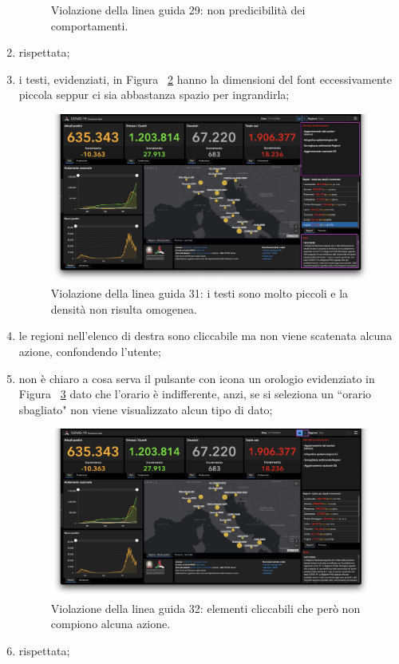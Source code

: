 \begin{enumerate}
\begin{figure}[H]
            \caption{Violazione della linea guida 29: non predicibilità dei comportamenti.}
            \label{fig:guidelines-violations-10}
        \end{figure}
    \item rispettata;
    \item i testi, evidenziati, in Figura ~\ref{fig:guidelines-violations-11} hanno la dimensioni del font eccessivamente piccola seppur ci sia abbastanza spazio per ingrandirla;
        \begin{figure}[H]
            \centering
            \includegraphics[width=0.5\columnwidth]{../../../assets/images/verifica-risorse-esistenti/guidelines_violations_13}
            \caption{Violazione della linea guida 31: i testi sono molto piccoli e la densità non risulta omogenea.}
            \label{fig:guidelines-violations-11}
        \end{figure}
    \item le regioni nell'elenco di destra sono cliccabile ma non viene scatenata alcuna azione, confondendo l'utente;
    \item non è chiaro a cosa serva il pulsante con icona un orologio evidenziato in Figura ~\ref{fig:guidelines-violations-12} dato che l'orario è indifferente, anzi, se si seleziona un ``orario sbagliato" non viene visualizzato alcun tipo di dato;
        \begin{figure}[H]
            \centering
            \includegraphics[width=0.5\columnwidth]{../../../assets/images/verifica-risorse-esistenti/guidelines_violations_14}
            \caption{Violazione della linea guida 32: elementi cliccabili che però non compiono alcuna azione.}
            \label{fig:guidelines-violations-12}
        \end{figure}
    \item rispettata;

\end{enumerate}
